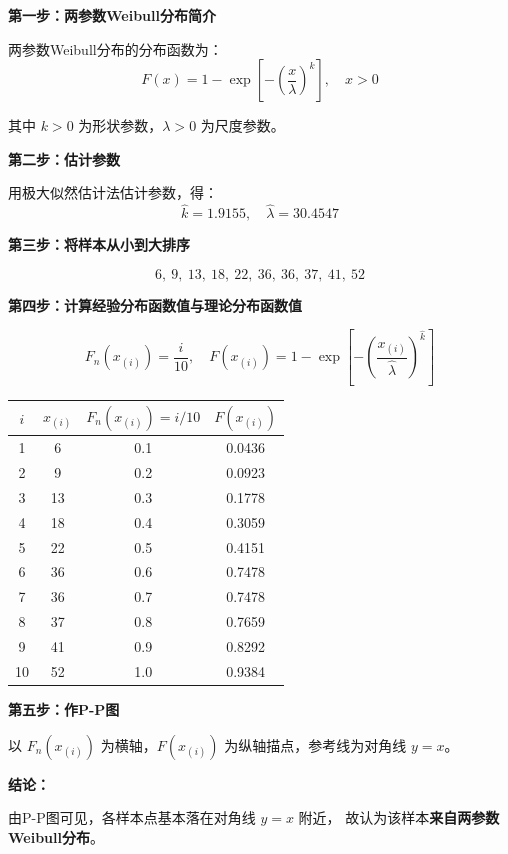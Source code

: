 \begin{solution}

\textbf{第一步：两参数Weibull分布简介}

两参数Weibull分布的分布函数为：
$$F(x) = 1 - \exp\!\left[-\left(\frac{x}{\lambda}\right)^k\right], \quad x > 0$$

其中 $k > 0$ 为形状参数，$\lambda > 0$ 为尺度参数。

\textbf{第二步：估计参数}

用极大似然估计法估计参数，得：
$$\hat{k} = 1.9155, \quad \hat{\lambda} = 30.4547$$

\textbf{第三步：将样本从小到大排序}

$$6,\ 9,\ 13,\ 18,\ 22,\ 36,\ 36,\ 37,\ 41,\ 52$$

\textbf{第四步：计算经验分布函数值与理论分布函数值}

$$F_n(x_{(i)}) = \frac{i}{10}, \quad
F(x_{(i)}) = 1 - \exp\!\left[-\left(\frac{x_{(i)}}{\hat{\lambda}}\right)^{\hat{k}}\right]$$

\begin{table}[h]
\centering
\begin{tabular}{cccc}
\hline
$i$ & $x_{(i)}$ & $F_n(x_{(i)}) = i/10$ & $F(x_{(i)})$ \\
\hline
1  & 6  & 0.1 & 0.0436 \\
2  & 9  & 0.2 & 0.0923 \\
3  & 13 & 0.3 & 0.1778 \\
4  & 18 & 0.4 & 0.3059 \\
5  & 22 & 0.5 & 0.4151 \\
6  & 36 & 0.6 & 0.7478 \\
7  & 36 & 0.7 & 0.7478 \\
8  & 37 & 0.8 & 0.7659 \\
9  & 41 & 0.9 & 0.8292 \\
10 & 52 & 1.0 & 0.9384 \\
\hline
\end{tabular}
\end{table}

\textbf{第五步：作P-P图}

以 $F_n(x_{(i)})$ 为横轴，$F(x_{(i)})$ 为纵轴描点，参考线为对角线 $y = x$。

\textbf{结论：}

由P-P图可见，各样本点基本落在对角线 $y = x$ 附近，
故认为该样本\textbf{来自两参数Weibull分布}。

\end{solution}
